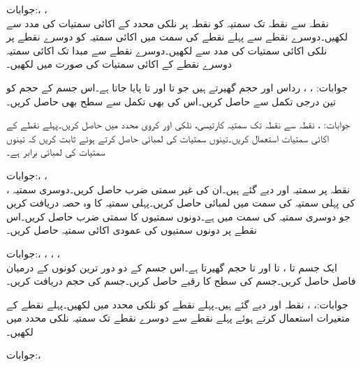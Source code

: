 جوابات:، ، \\ 
نقطہ  سے نقطہ  تک سمتیہ کو نقطہ  پر نلکی محدد کے اکائی سمتیات کی مدد سے لکھیں۔دوسرے نقطے سے پہلے نقطے کی سمت میں اکائی سمتیہ کو دوسرے  نقطے پر نلکی اکائی سمتیات کی مدد سے لکھیں۔دوسرے نقطے سے مبدا تک اکائی سمتیہ دوسرے نقطے کے اکائی سمتیات کی صورت  میں لکھیں۔ 

جوابات: ، ،  
رداس  اور  حجم گھیرتے ہیں جو  تا  اور  تا  پایا جاتا ہے۔اس جسم کے حجم کو تین درجی تکمل سے حاصل کریں۔اس کی بھی تکمل سے سطح بھی حاصل کریں۔

جوابات: ، 
نقطہ  سے نقطہ  تک سمتیہ کارتیسی، نلکی اور کروی محدد میں حاصل کریں۔پہلے نقطے کے اکائی سمتیات استعمال کریں۔تینوں سمتیات کی لمبائی حاصل کرتے ہوئے ثابت کریں کہ تینوں سمتیات کی لمبائی برابر ہے۔

جوابات:، ، \\
 ، 
نقطہ  پر سمتیہ  اور  دیے گئے ہیں۔ان کی غیر سمتی ضرب  حاصل کریں۔دوسری سمتیہ کی پہلی سمتیہ کی سمت میں لمبائی حاصل کریں۔پہلی سمتیہ کا وہ حصہ دریافت کریں جو دوسری سمتیہ کی سمت میں ہے۔دونوں سمتیوں کا سمتی ضرب  حاصل کریں۔اس نقطے پر دونوں سمتیوں کی عمودی اکائی سمتیہ حاصل کریں۔

جوابات:، ، ، ،\\ 
ایک جسم  تا ،  تا  اور  تا  حجم گھیرتا ہے۔اس جسم کے دو دور ترین کونوں کے درمیان فاصل حاصل کریں۔جسم کی سطح کا رقبے حاصل کریں۔جسم کی حجم دریافت کریں۔

جوابات:، ، 
نقطہ  اور  دیے گئے ہیں۔پہلے نقطے کو نلکی محدد میں لکھیں۔پہلے نقطے کے متغیرات استعمال کرتے ہوئے پہلے نقطے سے دوسرے نقطے تک سمتیہ نلکی محدد میں لکھیں۔

جوابات:، 
